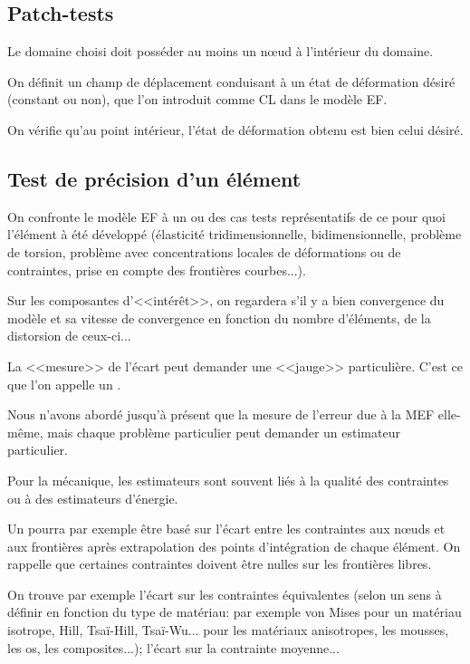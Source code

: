 \subsection{Patch-tests}

Le domaine choisi doit posséder au moins un nœud à l'intérieur du domaine.

On définit un champ de déplacement conduisant à un état de déformation
désiré (constant ou non), que l'on introduit comme CL dans le modèle EF.

On vérifie qu'au point intérieur, l'état de déformation obtenu est bien celui
désiré.

\medskip
\subsection{Test de précision d'un élément}

On confronte le modèle EF à un ou des cas tests représentatifs de ce pour
quoi l'élément à été développé (élasticité tridimensionnelle,
bidimensionnelle, problème de torsion, problème avec concentrations locales de 
déformations ou de contraintes, prise en compte des frontières courbes...).

Sur les composantes d'<<intérêt>>, on regardera s'il y a bien convergence
du modèle et sa vitesse de convergence en fonction du nombre d'éléments,
de la distorsion de ceux-ci...

\medskip
La <<mesure>> de l'écart peut demander une <<jauge>> particulière.
C'est ce que l'on appelle un .

Nous n'avons abordé jusqu'à présent que la mesure de l'erreur due à la
MEF elle-même, mais chaque problème particulier peut demander un
estimateur particulier.

Pour la mécanique, les estimateurs sont souvent liés à la qualité des
contraintes ou à des estimateurs d'énergie.

\medskip
Un  pourra par exemple être basé
sur l'écart entre les contraintes aux nœuds et aux frontières après
extrapolation des points d'intégration de chaque élément. On rappelle
que certaines contraintes doivent être nulles sur les frontières libres.

On trouve par exemple l'écart sur les contraintes équivalentes (selon un
sens à définir en fonction du type de matériau: par exemple von Mises
pour un matériau isotrope, Hill, 
Tsaï-Hill, 
Tsaï-Wu... 
pour les matériaux anisotropes, les mousses, les os, les composites...); 
l'écart sur la contrainte moyenne...

